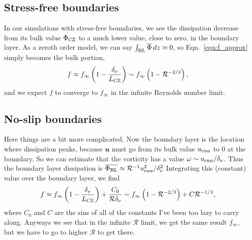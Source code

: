 \documentclass[12pt]{article}
\renewcommand{\vec}[1]{\boldsymbol{#1}}
\renewcommand{\bar}[1]{\overline{#1}}
\begin{document}
\subsection{Stress-free boundaries}
In our simulations with stress-free boundaries, we see the dissipation decrease from its bulk value $\Phi_{\rm{CZ}}$ to a much lower value, close to zero, in the boundary layer.
As a zeroth order model, we can say $\int_{\rm{BL}}\bar{\Phi}\,dz \approx 0$, so Eqn.~\ref{eqn:f_approx} simply becomes the bulk portion,
\begin{equation}
f \approx f_{\infty}\left(1 - \frac{\delta_\nu}{L_{\rm{CZ}}}\right)
\sim
f_{\infty}\left(1 - \mathcal{R}^{-2/3}\right),
\label{eqn:stressfree_f}
\end{equation}
and we expect $f$ to converge to $f_{\infty}$ in the infinite Reynolds number limit.

\subsection{No-slip boundaries}
Here things are a bit more complicated.
Now the boundary layer is the location where dissipation peaks, because $\vec{u}$ must go from its bulk value $u_{\rm{rms}}$ to 0 at the boundary.
So we can estimate that the vorticity has a value $\omega \sim u_{\rm{rms}}/\delta_{\nu}$.
Thus the boundary layer dissipation is $\bar{\Phi_{\rm{BL}}} \approx \mathcal{R}^{-1} u_{\rm{rms}}^2/\delta_{\nu}^{2}$
Integrating this (constant) value over the boundary layer, we find
\begin{equation}
f \approx f_{\infty}\left(1 - \frac{\delta_\nu}{L_{\rm{CZ}}}\right) + \frac{C_0}{\mathcal{R}\delta_{\nu}}
\sim
f_{\infty}\left(1 - \mathcal{R}^{-2/3}\right) + C \mathcal{R}^{-1/3},
\end{equation}
where $C_0$ and $C$ are the sins of all of the constants I've been too lazy to carry along.
Anyways we see that in the infinite $\mathcal{R}$ limit, we get the same result $f_{\infty}$, but we have to go to higher $\mathcal{R}$ to get there.
\end{document}
